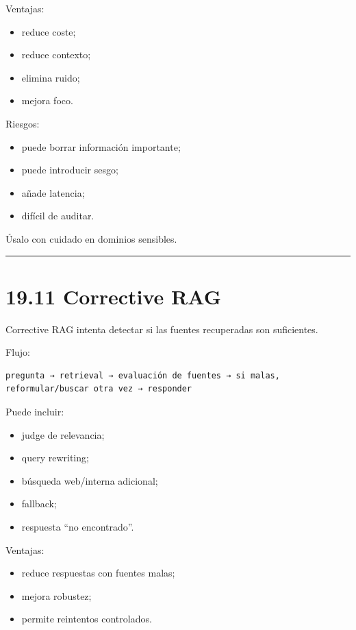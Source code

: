 Ventajas:

\begin{itemize}
\tightlist
\item
  reduce coste;
\item
  reduce contexto;
\item
  elimina ruido;
\item
  mejora foco.
\end{itemize}

Riesgos:

\begin{itemize}
\tightlist
\item
  puede borrar información importante;
\item
  puede introducir sesgo;
\item
  añade latencia;
\item
  difícil de auditar.
\end{itemize}

Úsalo con cuidado en dominios sensibles.

\begin{center}\rule{0.5\linewidth}{0.5pt}\end{center}

\section{19.11 Corrective RAG}\label{corrective-rag}

Corrective RAG intenta detectar si las fuentes recuperadas son
suficientes.

Flujo:

\begin{lstlisting}
pregunta → retrieval → evaluación de fuentes → si malas, reformular/buscar otra vez → responder
\end{lstlisting}

Puede incluir:

\begin{itemize}
\tightlist
\item
  judge de relevancia;
\item
  query rewriting;
\item
  búsqueda web/interna adicional;
\item
  fallback;
\item
  respuesta ``no encontrado''.
\end{itemize}

Ventajas:

\begin{itemize}
\tightlist
\item
  reduce respuestas con fuentes malas;
\item
  mejora robustez;
\item
  permite reintentos controlados.
\end{itemize}

